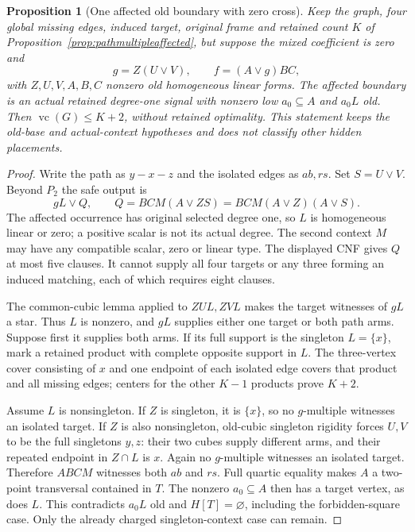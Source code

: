 \documentclass[11pt]{article}
\newcommand{\vc}{\operatorname{vc}}
\newtheorem{proposition}[theorem]{Proposition}
\theoremstyle{definition}
\theoremstyle{remark}
\begin{document}
\begin{proposition}[One affected old boundary with zero cross]\label{prop:pathsingleaffectedzero}
Keep the graph, four global missing edges, induced target, original frame and retained count $K$ of Proposition~\ref{prop:pathmultipleaffected}, but suppose the mixed coefficient is zero and
\[
 g=Z(U\vee V),\qquad f=(A\vee g)BC,
\]
with $Z,U,V,A,B,C$ nonzero old homogeneous linear forms. The affected boundary is an actual retained degree-one signal with nonzero low $a_0\subseteq A$ and $a_0L$ old. Then $\vc(G)\le K+2$, without retained optimality. This statement keeps the old-base and actual-context hypotheses and does not classify other hidden placements.
\end{proposition}
\begin{proof}
Write the path as $y-x-z$ and the isolated edges as $ab,rs$. Set $S=U\vee V$. Beyond $P_2$ the safe output is
\[
 gL\vee Q,\qquad Q=BCM(A\vee ZS)
   =BCM(A\vee Z)(A\vee S).
\]
The affected occurrence has original selected degree one, so $L$ is homogeneous linear or zero; a positive scalar is not its actual degree. The second context $M$ may have any compatible scalar, zero or linear type. The displayed CNF gives $Q$ at most five clauses. It cannot supply all four targets or any three forming an induced matching, each of which requires eight clauses.

The common-cubic lemma applied to $ZUL,ZVL$ makes the target witnesses of $gL$ a star. Thus $L$ is nonzero, and $gL$ supplies either one target or both path arms. Suppose first it supplies both arms. If its full support is the singleton $L=\{x\}$, mark a retained product with complete opposite support in $L$. The three-vertex cover consisting of $x$ and one endpoint of each isolated edge covers that product and all missing edges; centers for the other $K-1$ products prove $K+2$.

Assume $L$ is nonsingleton. If $Z$ is singleton, it is $\{x\}$, so no $g$-multiple witnesses an isolated target. If $Z$ is also nonsingleton, old-cubic singleton rigidity forces $U,V$ to be the full singletons $y,z$: their two cubes supply different arms, and their repeated endpoint in $Z\cap L$ is $x$. Again no $g$-multiple witnesses an isolated target. Therefore $ABCM$ witnesses both $ab$ and $rs$. Full quartic equality makes $A$ a two-point transversal contained in $T$. The nonzero $a_0\subseteq A$ then has a target vertex, as does $L$. This contradicts $a_0L$ old and $H[T]=\varnothing$, including the forbidden-square case. Only the already charged singleton-context case can remain.


\end{proof}
\end{document}
